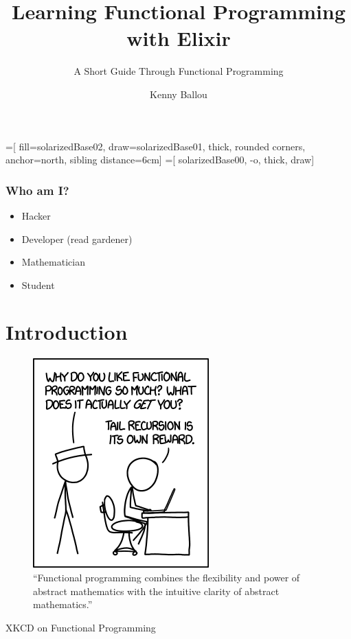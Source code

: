 \documentclass[english]{beamer}
\title{Learning Functional Programming with Elixir}
\subtitle{A Short Guide Through Functional Programming}
\author[Ballou]{Kenny Ballou}
\institute[zData]{%
    \inst{}%
    zData, Inc.
}
\begin{document}
=[%
    fill=solarizedBase02,
    draw=solarizedBase01,
    thick,
    rounded corners,
    anchor=north,
    sibling distance=6cm]
=[%
    solarizedBase00,
    -o,
    thick,
    draw]


\begin{frame}[label=titleslide]
\titlepage{}
\end{frame}

\begin{frame}
\tableofcontents[subsectionstyle=hide]
\end{frame}

\begin{frame}
\frametitle{Who am I?}
\begin{itemize}
\item{Hacker}
\item{Developer (read gardener)}
\item{Mathematician}
\item{Student}
\end{itemize}

\end{frame}

\section{Introduction}

\begin{frame}
\begin{figure}
\includegraphics[scale=0.45]{xkcd_functional.png}
\caption{``Functional programming combines the flexibility and power of
abstract mathematics with the intuitive clarity of abstract mathematics.''}
\end{figure}
XKCD on Functional Programming\cite{website:xkcd_functional}
\end{frame}
\end{document}
